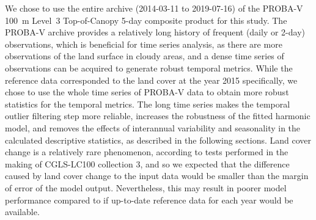 \documentclass[review,authoryear,3p]{elsarticle}
\begin{document}

\label{sec-temporal-filter}

We chose to use the entire archive (2014-03-11 to 2019-07-16) of the PROBA-V 100~m Level~3 Top-of-Canopy 5-day composite product \citep{dierckx2014probav,probavguide2} for this study.
The PROBA-V archive provides a relatively long history of frequent (daily or 2-day) observations, which is beneficial for time series analysis, as there are more observations of the land surface in cloudy areas, and a dense time series of observations can be acquired to generate robust temporal metrics.
While the reference data corresponded to the land cover at the year 2015 specifically, we chose to use the whole time series of PROBA-V data to obtain more robust statistics for the temporal metrics.
The long time series makes the temporal outlier filtering step more reliable, increases the robustness of the fitted harmonic model, and removes the effects of interannual variability and seasonality in the calculated descriptive statistics, as described in the following sections.
Land cover change is a relatively rare phenomenon, according to tests performed in the making of \gls{CGLS-LC100} collection 3, and so we expected that the difference caused by land cover change to the input data would be smaller than the margin of error of the model output.
Nevertheless, this may result in poorer model performance compared to if up-to-date reference data for each year would be available.
\end{document}

